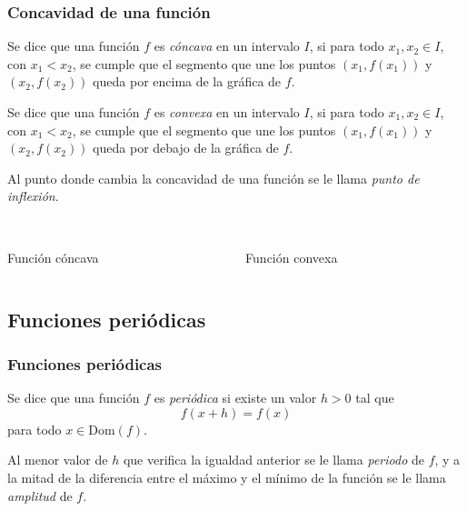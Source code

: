 \begin{frame}
\frametitle{Concavidad de una función}
\begin{definicion}
Se dice que una función $f$ es \emph{cóncava} en un intervalo $I$, si para todo $x_1,x_2\in I$, con $x_1<x_2$, se cumple
que el segmento que une los puntos $(x_1,f(x_1))$ y $(x_2,f(x_2))$ queda por encima de la gráfica de $f$.

Se dice que una función $f$ es \emph{convexa} en un intervalo $I$, si para todo $x_1,x_2\in I$, con $x_1<x_2$, se cumple
que el segmento que une los puntos $(x_1,f(x_1))$ y $(x_2,f(x_2))$ queda por debajo de la gráfica de $f$.

Al punto donde cambia la concavidad de una función se le llama \emph{punto de inflexión}.
\end{definicion}

\begin{columns}
\begin{column}{0.4\textwidth}
\begin{center}
\scalebox{1}{}\\
\color{red}Función cóncava
\end{center}
\end{column}
\begin{column}{0.4\textwidth}
\begin{center}
\scalebox{1}{}\\
\color{red}Función convexa
\end{center}
\end{column}
\end{columns}
\end{frame} 



\subsection{Funciones periódicas}
\begin{frame}
\frametitle{Funciones periódicas}
\begin{definicion}
Se dice que una función $f$ es \emph{periódica} si existe un valor $h>0$ tal que
\[f(x+h)=f(x)\]
para todo $x\in \textrm{Dom}(f)$.

Al menor valor de $h$ que verifica la igualdad anterior se le llama \emph{periodo} de $f$, y a la mitad de la diferencia entre el
máximo y el mínimo de la función se le llama \emph{amplitud} de $f$.
\end{definicion}

\begin{center}
\scalebox{0.8}{}
\end{center}
\end{frame} 



